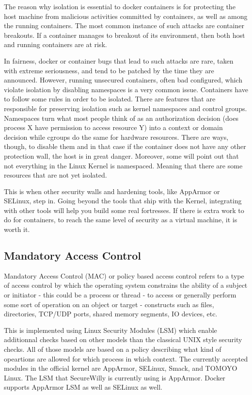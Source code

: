 The reason why isolation is essential to docker containers is for protecting the host machine from malicious activities committed by containers, as well as among the running containers. The most common instance of such attacks are container breakouts. If a container manages to breakout of its environment, then both host and running containers are at risk. 

In fairness, docker or container bugs that lead to such attacks are rare, taken with extreme seriousness, and tend to be patched by the time they are announced. However, running unsecured containers, often bad configured, which violate isolation by disabling namespaces is a very common issue. Containers have to follow some rules in order to be isolated. There are features that are responsible for preserving isolation such as kernel namespaces and control groups. Namespaces turn what most people think of as an authorization decision (does process X have permission to access resource Y) into a context or domain decision while cgroups do the same for hardware resources. There are ways, though, to disable them and in that case if the container does not have any other protection wall, the host is in great danger. Moreover, some will point out that not everything in the Linux Kernel is namespaced. Meaning that there are some resources that are not yet isolated.

This is when other security walls and hardening tools, like AppArmor or SELinux, step in. Going beyond the tools that ship with the Kernel, integrating with other tools will help you build some real fortresses. If there is extra work to do for containers, to reach the same level of security as a virtual machine, it is worth it. \cite{isolatiocont}

\subsection{Mandatory Access Control}
Mandatory Access Control (MAC) or policy based access control refers to a type of access control by which the operating system constrains the ability of a subject or initiator - this could be a process or thread - to access or generally perform some sort of operation on an object or target - constructs such as files, directories, TCP/UDP ports, shared memory segments, IO devices, etc. \cite{wikimac}

This is implemented using Linux Security Modules (LSM) which enable additionnal checks based on other models than the classical UNIX style security checks. All of those models are based on a policy describing what kind of opeartions are allowed for which process in which context. The currently accepted modules in the official kernel are AppArmor, SELinux, Smack, and TOMOYO Linux. The LSM that SecureWilly is currently using is AppArmor. Docker supports AppArmor LSM as well as SELinux as well.

